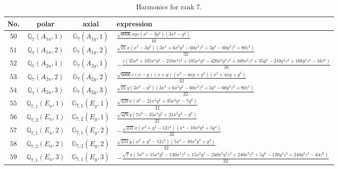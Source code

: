 \documentclass[fleqn,8pt,landscape]{jsarticle}
\begin{document}
\begin{table}[ht!]
\begin{center}
\caption{Harmonics for rank 7.}
\renewcommand{\arraystretch}{1.3}
\begin{tabular}{cccl} \hline \hline
No. & polar & axial & expression \\ \hline
$ 50 $ & $ \mathbb{Q}_{7}(A_{1u},1) $ & $ \mathbb{G}_{7}(A_{1g},1) $ & $ \frac{\sqrt{6006} x y z \left(x^{2} - 3 y^{2}\right) \left(3 x^{2} - y^{2}\right)}{16} $ \\
$ 51 $ & $ \mathbb{Q}_{7}(A_{1u},2) $ & $ \mathbb{G}_{7}(A_{1g},2) $ & $ \frac{\sqrt{21} x \left(x^{2} - 3 y^{2}\right) \left(3 x^{4} + 6 x^{2} y^{2} - 60 x^{2} z^{2} + 3 y^{4} - 60 y^{2} z^{2} + 80 z^{4}\right)}{32} $ \\
$ 52 $ & $ \mathbb{Q}_{7}(A_{2u},1) $ & $ \mathbb{G}_{7}(A_{2g},1) $ & $ - \frac{z \left(35 x^{6} + 105 x^{4} y^{2} - 210 x^{4} z^{2} + 105 x^{2} y^{4} - 420 x^{2} y^{2} z^{2} + 168 x^{2} z^{4} + 35 y^{6} - 210 y^{4} z^{2} + 168 y^{2} z^{4} - 16 z^{6}\right)}{16} $ \\
$ 53 $ & $ \mathbb{Q}_{7}(A_{2u},2) $ & $ \mathbb{G}_{7}(A_{2g},2) $ & $ \frac{\sqrt{6006} z \left(x - y\right) \left(x + y\right) \left(x^{2} - 4 x y + y^{2}\right) \left(x^{2} + 4 x y + y^{2}\right)}{32} $ \\
$ 54 $ & $ \mathbb{Q}_{7}(A_{2u},3) $ & $ \mathbb{G}_{7}(A_{2g},3) $ & $ \frac{\sqrt{21} y \left(3 x^{2} - y^{2}\right) \left(3 x^{4} + 6 x^{2} y^{2} - 60 x^{2} z^{2} + 3 y^{4} - 60 y^{2} z^{2} + 80 z^{4}\right)}{32} $ \\
$ 55 $ & $ \mathbb{Q}_{7,1}(E_{u},1) $ & $ \mathbb{G}_{7,1}(E_{g},1) $ & $ \frac{\sqrt{429} x \left(x^{6} - 21 x^{4} y^{2} + 35 x^{2} y^{4} - 7 y^{6}\right)}{32} $ \\
$ 56 $ & $ \mathbb{Q}_{7,2}(E_{u},1) $ & $ \mathbb{G}_{7,2}(E_{g},1) $ & $ \frac{\sqrt{429} y \left(7 x^{6} - 35 x^{4} y^{2} + 21 x^{2} y^{4} - y^{6}\right)}{32} $ \\
$ 57 $ & $ \mathbb{Q}_{7,1}(E_{u},2) $ & $ \mathbb{G}_{7,1}(E_{g},2) $ & $ - \frac{\sqrt{231} x \left(x^{2} + y^{2} - 12 z^{2}\right) \left(x^{4} - 10 x^{2} y^{2} + 5 y^{4}\right)}{32} $ \\
$ 58 $ & $ \mathbb{Q}_{7,2}(E_{u},2) $ & $ \mathbb{G}_{7,2}(E_{g},2) $ & $ \frac{\sqrt{231} y \left(x^{2} + y^{2} - 12 z^{2}\right) \left(5 x^{4} - 10 x^{2} y^{2} + y^{4}\right)}{32} $ \\
$ 59 $ & $ \mathbb{Q}_{7,1}(E_{u},3) $ & $ \mathbb{G}_{7,1}(E_{g},3) $ & $ - \frac{\sqrt{7} x \left(5 x^{6} + 15 x^{4} y^{2} - 120 x^{4} z^{2} + 15 x^{2} y^{4} - 240 x^{2} y^{2} z^{2} + 240 x^{2} z^{4} + 5 y^{6} - 120 y^{4} z^{2} + 240 y^{2} z^{4} - 64 z^{6}\right)}{32} $ \\

\end{tabular}
\end{center}
\end{table}
\end{document}
